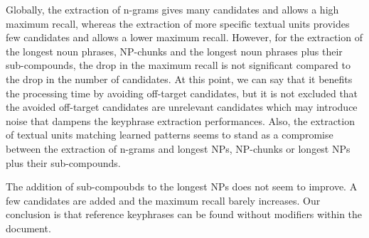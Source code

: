       Globally, the extraction  of n-grams gives many candidates and allows a
      high maximum recall, whereas the extraction of more specific textual units
      provides few candidates and allows a lower maximum recall. However, for
      the extraction of the longest noun phrases, NP-chunks and the longest noun
      phrases plus their sub-compounds, the drop in the maximum recall is not
      significant compared to the drop in the number of candidates. At this
      point, we can say that it benefits the processing time by avoiding
      off-target candidates, but it is not excluded that the avoided off-target
      candidates are unrelevant candidates which may introduce noise that
      dampens the keyphrase extraction performances. Also, the extraction of
      textual units matching learned patterns seems to stand as a compromise
      between the extraction of n-grams and longest NPs, NP-chunks or longest
      NPs plus their sub-compounds.

      The addition of sub-compoubds to the longest NPs does not seem to improve.
      A few candidates are added and the maximum recall barely increases. Our
      conclusion is that reference keyphrases can be found without modifiers
      within the document.

